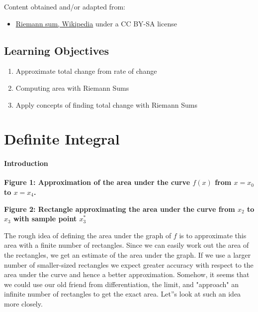 Content obtained and/or adapted from:



\begin{itemize}
    \item \href{https://en.wikipedia.org/wiki/Riemann_sum}{Riemann sum, Wikipedia} under a CC BY-SA license
\end{itemize}

\subsection{Learning Objectives}

\begin{enumerate}
    \item Approximate total change from rate of change
    \item Computing area with Riemann Sums
    \item Apply concepts of finding total change with Riemann Sums
\end{enumerate}

\section{Definite Integral}
\label{sec:definite-integral}

\paragraph{Introduction}




\textbf{Figure 1: Approximation of the area under the curve $f(x)$ from $x = x_0$ to $x = x_4$.}




\textbf{Figure 2: Rectangle approximating the area under the curve from $x_2$ to $x_3$ with sample point $x_3^\ast$}



The rough idea of defining the area under the graph of $f$ is to approximate this area with a finite number of rectangles. Since we can easily work out the area of the rectangles, we get an estimate of the area under the graph. If we use a larger number of smaller-sized rectangles we expect greater accuracy with respect to the area under the curve and hence a better approximation. Somehow, it seems that we could use our old friend from differentiation, the limit, and "approach" an infinite number of rectangles to get the exact area. Let''s look at such an idea more closely.



